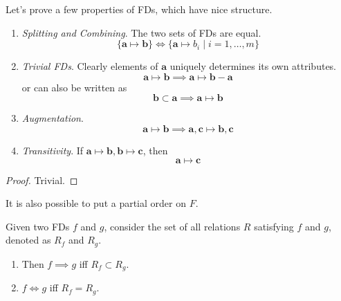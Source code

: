 \documentclass{article}
\begin{document}
      \begin{theorem}
        Let's prove a few properties of FDs, which have nice structure. 
        \begin{enumerate}
          \item \textit{Splitting and Combining}. The two sets of FDs are equal. 
            \begin{equation}
              \{\mathbf{a} \mapsto \mathbf{b}\} \iff \{ \mathbf{a} \mapsto b_i \mid i = 1, \ldots, m\}
            \end{equation}

          \item \textit{Trivial FDs}. Clearly elements of $\mathbf{a}$ uniquely determines its own attributes. 
            \begin{equation}
              \mathbf{a} \mapsto \mathbf{b} \implies \mathbf{a} \mapsto \mathbf{b} - \mathbf{a}
            \end{equation}
            or can also be written as 
            \begin{equation}
              \mathbf{b} \subset \mathbf{a} \implies \mathbf{a} \mapsto \mathbf{b}
            \end{equation}

          \item \textit{Augmentation}. 
            \begin{equation}
              \mathbf{a} \mapsto \mathbf{b} \implies \mathbf{a}, \mathbf{c} \mapsto \mathbf{b}, \mathbf{c}
            \end{equation}

          \item \textit{Transitivity}. If $\mathbf{a} \mapsto \mathbf{b}, \mathbf{b} \mapsto \mathbf{c}$, then 
            \begin{equation}
              \mathbf{a} \mapsto \mathbf{c}
            \end{equation}
        \end{enumerate}
      \end{theorem}
      \begin{proof}
        Trivial. 
      \end{proof}

      It is also possible to put a partial order on $F$. 

      \begin{definition}
        Given two FDs $f$ and $g$, consider the set of all relations $R$ satisfying $f$ and $g$, denoted as $R_f$ and $R_g$. 
        \begin{enumerate}
          \item Then $f \implies g$ iff $R_f \subset R_g$. 
          \item $f \iff g$ iff $R_f = R_g$. 
        \end{enumerate}
      \end{definition}
\end{document}
